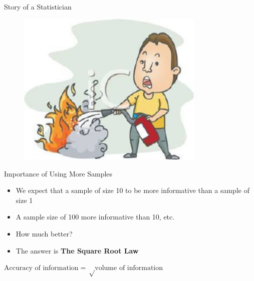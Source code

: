 \documentclass[first=dgreen,second=purple,logo=redexc]{aaltoslides}
\makeatletter
\newcommand{\fq@author}{}
\newcommand*{\fqsource}[1]{\gdef\fq@source{#1}}
\newenvironment{fquote}[1][]{%
\def\fq@author{#1}%
\let\fq@source\@empty
  \vspace{1em}
  \begin{list}{}{%
      \setlength{\leftmargin}{0.2\textwidth}
      \setlength{\rightmargin}{0.2\textwidth}
    }
    \item[]%
    \begin{picture}(0,0)(0,0)
      \put(-15,-5){\makebox(0,0){%
	  \scalebox{5}{\textcolor{quotemark}{\bfseries``}}}%
      }
    \end{picture}\em\ignorespaces%
}{%
  \newline%
  \makebox[0pt][l]{\hspace{0.6\textwidth}%
  \begin{picture}(0,0)(0,0)
    \put(15,10){\makebox(0,0){%
	\scalebox{5}{\textcolor{quotemark}{\rm\bfseries''}}}%
    }
  \end{picture}}%
  \ifx\fq@author\@empty\else\hfill\textsc{--- \fq@author}\fi
  \ifx\fq@source\@empty\else\\\mbox{}\hfill\textsl{\small\fq@source}\fi
  \end{list}
  \ifx\fq@author\@empty\else\vspace{1em}\fi
}
\makeatother
\begin{document}

\begin{frame} {Story of a Statistician} 

\begin{figure}
\centering
  \includegraphics[width=0.8\textwidth]{figures/fire}
\end{figure}

\end{frame}


\begin{frame} {Importance of Using More Samples} 

\begin{itemize}\setlength{\itemsep}{7mm}
\item We expect that a sample of size 10 to be more informative than a sample of size 1 \\
\item A sample size of 100  more informative than 10, etc. \\ 
\item {\color{red} How much better?} \\
\item The answer is \textbf{The Square Root Law}
\end{itemize}

\vspace{2mm}
 
 $\text{Accuracy of information} = \sqrt \text{volume of information}$

 

\end{frame}
\end{document}
